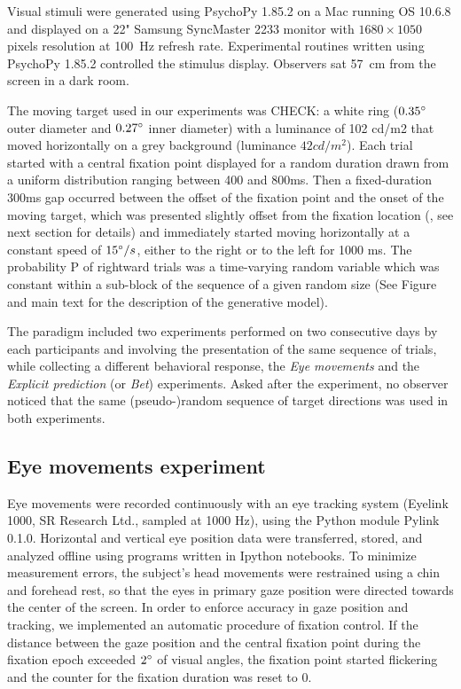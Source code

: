 \documentclass[12pt,english]{article}%
\newcommand{\citet}[1]{\textcite{#1}}
\begin{document}
Visual stimuli were generated using PsychoPy 1.85.2 on a Mac running OS 10.6.8 and displayed on a 22" Samsung SyncMaster 2233 monitor with $1680\times 1050$ pixels resolution at 100~\si{\Hz} refresh rate. Experimental routines written using PsychoPy 1.85.2 controlled the stimulus display. Observers sat 57~\si{\cm} from the screen in a dark room. 

The moving target used in our experiments was CHECK: a white ring ($0.35\degree$ outer diameter and $0.27\degree$ inner diameter) with a luminance of 102 cd/m2 that moved horizontally on a grey background (luminance $42cd/m^2$). Each trial started with a central fixation point displayed for a random duration drawn from a uniform distribution ranging between 400 and 800ms. Then a fixed-duration 300ms gap occurred between the offset of the fixation point and the onset of the moving target, which was presented slightly offset from the fixation location (\citet{Rashbass}, see next section for details) and immediately started moving horizontally at a constant speed of $15\degree/s$, either to the right or to the left for 1000 ms. The probability P of rightward trials was a time-varying random variable which was constant within a sub-block of the sequence of a given random size (See Figure  and main text for the description of the generative model). 

The paradigm included two experiments performed on two consecutive days by each participants and involving the presentation of the same sequence of trials, while collecting a different behavioral response, the \textit{Eye movements} and the \textit{Explicit prediction} (or \textit{Bet}) experiments. Asked after the experiment, no observer noticed that the same (pseudo-)random sequence of target directions was used in both experiments.

\subsection{Eye movements experiment}
Eye movements were recorded continuously with an eye tracking system (Eyelink 1000, SR Research Ltd., sampled at 1000 Hz), using the Python module Pylink 0.1.0. Horizontal and vertical eye position data were transferred, stored, and analyzed offline using programs written in Ipython notebooks.
To minimize measurement errors, the subject's head movements were restrained using a chin and forehead rest, so that the eyes in primary gaze position were directed towards the center of the screen. In order to enforce accuracy in gaze position and tracking, we implemented an automatic procedure of fixation control. If the distance between the gaze position and the central fixation point during the fixation epoch exceeded $2\degree$ of visual angles, the fixation point started flickering and the counter for the fixation duration was reset to $0$. 
\end{document}
